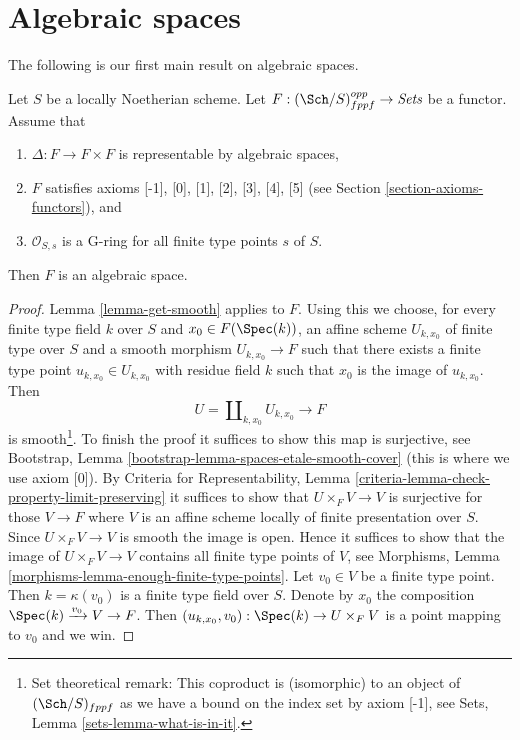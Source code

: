 \section{Algebraic spaces}
\label{section-algebraic-spaces}

\noindent
The following is our first main result on algebraic spaces.

\begin{proposition}
\label{proposition-spaces-diagonal-representable}
Let $S$ be a locally Noetherian scheme. Let
$F : (\Sch/S)_{fppf}^{opp} \to \textit{Sets}$ be a functor. Assume that
\begin{enumerate}
\item $\Delta : F \to F \times F$ is representable by algebraic spaces,
\item $F$ satisfies axioms [-1], [0], [1], [2], [3], [4], [5]
(see Section \ref{section-axioms-functors}), and
\item $\mathcal{O}_{S, s}$ is a G-ring for all finite type points $s$ of $S$.
\end{enumerate}
Then $F$ is an algebraic space.
\end{proposition}

\begin{proof}
Lemma \ref{lemma-get-smooth} applies to $F$. Using this we
choose, for every finite type field $k$ over $S$ and $x_0 \in F(\Spec(k))$,
an affine scheme $U_{k, x_0}$ of finite type over $S$ and a smooth morphism
$U_{k, x_0} \to F$ such that there exists a finite type point
$u_{k, x_0} \in U_{k, x_0}$ with residue field $k$ such that $x_0$
is the image of $u_{k, x_0}$. Then
$$
U = \coprod\nolimits_{k, x_0} U_{k, x_0} \longrightarrow F
$$
is smooth\footnote{Set theoretical remark: This coproduct is (isomorphic)
to an object of $(\Sch/S)_{fppf}$ as we have a bound on the index set
by axiom [-1], see Sets, Lemma \ref{sets-lemma-what-is-in-it}.}.
To finish the proof it suffices to show this map is surjective,
see Bootstrap, Lemma \ref{bootstrap-lemma-spaces-etale-smooth-cover}
(this is where we use axiom [0]). By Criteria for Representability, Lemma
\ref{criteria-lemma-check-property-limit-preserving}
it suffices to show that $U \times_F V \to V$ is surjective for those
$V \to F$ where $V$ is an affine scheme locally of finite presentation
over $S$. Since $U \times_F V \to V$ is smooth the image is open. Hence
it suffices to show that the image of $U \times_F V \to V$ contains all
finite type points of $V$, see
Morphisms, Lemma \ref{morphisms-lemma-enough-finite-type-points}.
Let $v_0 \in V$ be a finite type point. Then $k = \kappa(v_0)$ is
a finite type field over $S$. Denote by $x_0$ the composition
$\Spec(k) \xrightarrow{v_0} V \to F$. Then
$(u_{k, x_0}, v_0) : \Spec(k) \to U \times_F V$ is a point mapping to
$v_0$ and we win.
\end{proof}

